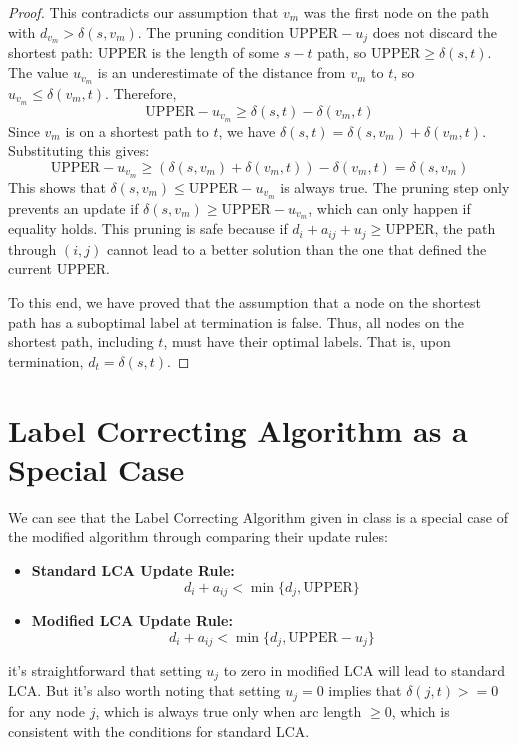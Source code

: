 \documentclass[11pt, a4paper, oneside]{memoir}
\newcommand{\UPPER}{\text{UPPER}}
\begin{document}
\begin{proof}
This contradicts our assumption that $v_m$ was the first node on the path with $d_{v_m} > \delta(s, v_m)$.
The pruning condition $\UPPER - u_j$ does not discard the shortest path: $\UPPER$ is the length of some $s-t$ path, so $\UPPER \ge \delta(s, t)$. The value $u_{v_m}$ is an underestimate of the distance from $v_m$ to $t$, so $u_{v_m} \le \delta(v_m, t)$.
Therefore,
\[ \UPPER - u_{v_m} \ge \delta(s, t) - \delta(v_m, t) \]
Since $v_m$ is on a shortest path to $t$, we have $\delta(s, t) = \delta(s, v_m) + \delta(v_m, t)$. Substituting this gives:
\[ \UPPER - u_{v_m} \ge (\delta(s, v_m) + \delta(v_m, t)) - \delta(v_m, t) = \delta(s, v_m) \]
This shows that $\delta(s, v_m) \le \UPPER - u_{v_m}$ is always true.
The pruning step only prevents an update if $\delta(s, v_m) \ge \UPPER - u_{v_m}$, which can only happen if equality holds.
This pruning is safe because if $d_i + a_{ij} + u_j \ge \UPPER$,
the path through $(i,j)$ cannot lead to a better solution than the one that defined the current $\UPPER$.

To this end, we have proved that the assumption that a node on the shortest path has a suboptimal label at termination is false.
Thus, all nodes on the shortest path, including $t$, must have their optimal labels.
That is, upon termination, $d_t = \delta(s, t)$.
\end{proof}

\newpage
\section{Label Correcting Algorithm as a Special Case}
We can see that the Label Correcting Algorithm given in class is a special case of the modified algorithm
through comparing their update rules:
\begin{itemize}
  \item \textbf{Standard LCA Update Rule:}
  \[ d_i + a_{ij} < \min\{d_j, \UPPER\} \]
  \item \textbf{Modified LCA Update Rule:}
  \[ d_i + a_{ij} < \min\{d_j, \UPPER - u_j\} \]
\end{itemize}
it's straightforward that setting $u_j$ to zero in modified LCA will lead to standard LCA.
But it's also worth noting that setting $u_j=0$ implies that $\delta(j,t)>=0$ for any node $j$,
which is always true only when arc length $\geq 0$, which is consistent with the conditions for standard LCA.
\end{document}
